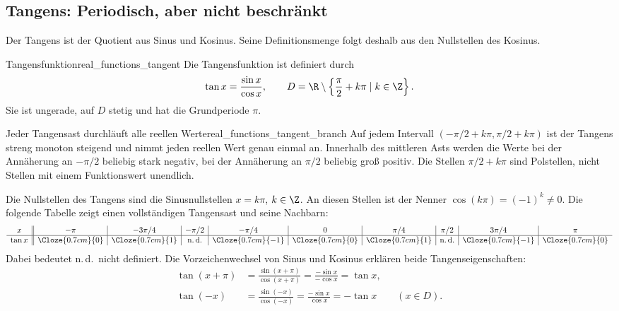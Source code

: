 \subsection{Tangens: Periodisch, aber nicht beschränkt}
\label{subsec:real_functions_tangent}
Der Tangens ist der Quotient aus Sinus und Kosinus. Seine
Definitionsmenge folgt deshalb aus den Nullstellen des Kosinus.
\begin{DefinitionBox}{Tangensfunktion}{real_functions_tangent}
  Die Tangensfunktion ist definiert durch
  \[
    \tan x=\frac{\sin x}{\cos x},
    \qquad D=\R\setminus\left\{\frac\pi2+k\pi\mid k\in\Z\right\}.
  \]
  Sie ist ungerade, auf $D$ stetig und hat die Grundperiode $\pi$.
\end{DefinitionBox}
\begin{center}
\end{center}
\begin{KeyPointBox}{Jeder Tangensast durchläuft alle reellen Werte}{real_functions_tangent_branch}
  Auf jedem Intervall $(-\pi/2+k\pi,\pi/2+k\pi)$ ist der Tangens
  streng monoton steigend und nimmt jeden reellen Wert genau einmal an.
  Innerhalb des mittleren Asts werden die Werte bei der Annäherung
  an $-\pi/2$ beliebig stark negativ, bei der Annäherung an $\pi/2$
  beliebig groß positiv.
  Die Stellen $\pi/2+k\pi$ sind Polstellen, nicht Stellen mit einem
  Funktionswert \glqq unendlich\grqq.
\end{KeyPointBox}
Die Nullstellen des Tangens sind die Sinusnullstellen $x=k\pi$, $k\in\Z$.
An diesen Stellen ist der Nenner $\cos(k\pi)=(-1)^k\ne0$.
Die folgende Tabelle zeigt einen vollständigen Tangensast und seine Nachbarn:
\[
  \begin{array}{c||c|c|c|c|c|c|c|c|c}
    x&-\pi&-3\pi/4&-\pi/2&-\pi/4&0&\pi/4&\pi/2&3\pi/4&\pi\\\hline
    \tan x&\Cloze{0.7cm}{0}&\Cloze{0.7cm}{1}&\text{n.\,d.}&
      \Cloze{0.7cm}{-1}&\Cloze{0.7cm}{0}&\Cloze{0.7cm}{1}&\text{n.\,d.}&
      \Cloze{0.7cm}{-1}&\Cloze{0.7cm}{0}
  \end{array}
\]
Dabei bedeutet \glqq n.\,d.\grqq\ \glqq nicht definiert\grqq.
Die Vorzeichenwechsel von Sinus und Kosinus erklären beide Tangenseigenschaften:
\[
  \begin{aligned}
    \tan(x+\pi)&=\frac{\sin(x+\pi)}{\cos(x+\pi)}
      =\frac{-\sin x}{-\cos x}=\tan x,\\[0.7em]
    \tan(-x)&=\frac{\sin(-x)}{\cos(-x)}
      =\frac{-\sin x}{\cos x}=-\tan x\qquad(x\in D).
  \end{aligned}
\]

